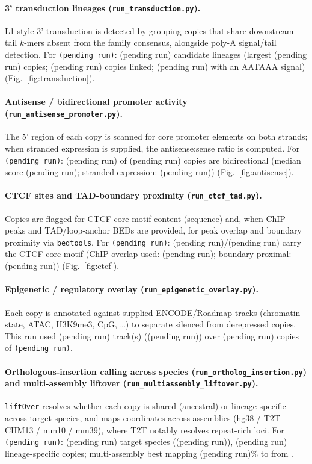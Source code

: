 \documentclass[11pt]{article}
\providecommand{\transFamily}{(pending run)}\providecommand{\transNCopies}{(pending run)}
\providecommand{\transNLineages}{(pending run)}\providecommand{\transLargestLineage}{(pending run)}
\providecommand{\transNInLineage}{(pending run)}\providecommand{\transNPolyaSignal}{(pending run)}
\providecommand{\antiFamily}{(pending run)}\providecommand{\antiNCopies}{(pending run)}
\providecommand{\antiNBidir}{(pending run)}\providecommand{\antiMedBidir}{(pending run)}
\providecommand{\antiHasStranded}{(pending run)}\providecommand{\antiMedAntisenseFrac}{(pending run)}
\providecommand{\ctcfFamily}{(pending run)}\providecommand{\ctcfNCopies}{(pending run)}
\providecommand{\ctcfNMotif}{(pending run)}\providecommand{\ctcfUsedChip}{(pending run)}
\providecommand{\ctcfNBoundaryProx}{(pending run)}\providecommand{\ctcfMedTadDistKb}{(pending run)}
\providecommand{\epiFamily}{(pending run)}\providecommand{\epiNCopies}{(pending run)}
\providecommand{\epiNTracks}{(pending run)}\providecommand{\epiTrackList}{(pending run)}
\providecommand{\orthoFamily}{(pending run)}\providecommand{\orthoNCopies}{(pending run)}
\providecommand{\orthoNSpecies}{(pending run)}\providecommand{\orthoSpeciesList}{(pending run)}
\providecommand{\orthoNLineageSpecific}{(pending run)}
\providecommand{\masmBestRate}{(pending run)}
\begin{document}
\paragraph{3' transduction lineages (\texttt{run\_transduction.py}).}
L1-style 3' transduction is detected by grouping copies that share downstream-tail
$k$-mers absent from the family consensus, alongside poly-A signal/tail detection.
For \texttt{\transFamily}: \transNLineages{} candidate lineages (largest
\transLargestLineage{} copies; \transNInLineage{} copies linked;
\transNPolyaSignal{} with an AATAAA signal) (Fig.~\ref{fig:transduction}).

\paragraph{Antisense / bidirectional promoter activity (\texttt{run\_antisense\_promoter.py}).}
The 5' region of each copy is scanned for core promoter elements on both strands;
when stranded expression is supplied, the antisense:sense ratio is computed.
For \texttt{\antiFamily}: \antiNBidir{} of \antiNCopies{} copies are bidirectional
(median score \antiMedBidir; stranded expression: \antiHasStranded)
(Fig.~\ref{fig:antisense}).

\paragraph{CTCF sites and TAD-boundary proximity (\texttt{run\_ctcf\_tad.py}).}
Copies are flagged for CTCF core-motif content (sequence) and, when ChIP peaks and
TAD/loop-anchor BEDs are provided, for peak overlap and boundary proximity via
\texttt{bedtools}. For \texttt{\ctcfFamily}: \ctcfNMotif{}/\ctcfNCopies{} carry the
CTCF core motif (ChIP overlap used: \ctcfUsedChip; boundary-proximal:
\ctcfNBoundaryProx) (Fig.~\ref{fig:ctcf}).

\paragraph{Epigenetic / regulatory overlay (\texttt{run\_epigenetic\_overlay.py}).}
Each copy is annotated against supplied ENCODE/Roadmap tracks (chromatin state,
ATAC, H3K9me3, CpG, \dots) to separate silenced from derepressed copies. This run
used \epiNTracks{} track(s) (\epiTrackList) over \epiNCopies{} copies of
\texttt{\epiFamily}.

\paragraph{Orthologous-insertion calling across species (\texttt{run\_ortholog\_insertion.py})
and multi-assembly liftover (\texttt{run\_multiassembly\_liftover.py}).}
\texttt{liftOver} resolves whether each copy is shared (ancestral) or
lineage-specific across target species, and maps coordinates across assemblies
(hg38 / T2T-CHM13 / mm10 / mm39), where T2T notably resolves repeat-rich loci.
For \texttt{\orthoFamily}: \orthoNSpecies{} target species
(\orthoSpeciesList), \orthoNLineageSpecific{} lineage-specific copies; multi-assembly
best mapping \masmBestRate\% to \masmBestAsm{} from \masmSource.
\end{document}
